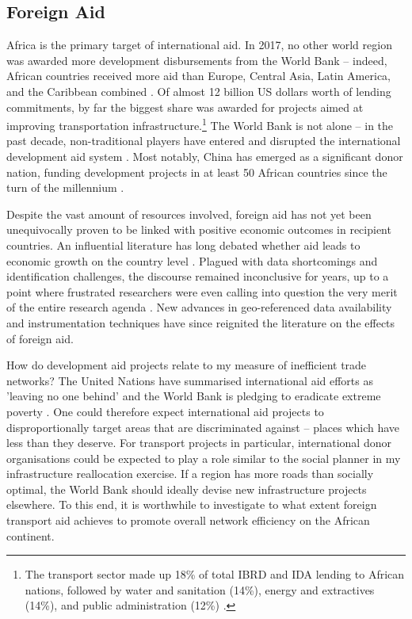 \documentclass[11pt, oneside]{article}   	%
\begin{document}
\subsection{Foreign Aid}
Africa is the primary target of international aid. In 2017, no other world region was awarded more development disbursements from the World Bank -- indeed, African countries received more aid than Europe, Central Asia, Latin America, and the Caribbean combined \citep{TheWorldBank_WorldBankAnnual_2017}. Of almost 12 billion US dollars worth of lending commitments, by far the biggest share was awarded for projects aimed at improving transportation infrastructure.\footnote{The transport sector made up 18\% of total IBRD and IDA lending to African nations, followed by water and sanitation (14\%), energy and extractives (14\%), and public administration (12\%) \citep{TheWorldBank_WorldBankAnnual_2017}.} The World Bank is not alone -- in the past decade, non-traditional players have entered and disrupted the international development aid system \citep{Dreher_Rogueaidempirical_2015}. Most notably, China has emerged as a significant donor nation, funding development projects in at least 50 African countries since the turn of the millennium \citep{Strange_TrackingUnderreportedFinancial_2017}.

Despite the vast amount of resources involved, foreign aid has not yet been unequivocally proven to be linked with positive economic outcomes in recipient countries. An influential literature has long debated whether aid leads to economic growth on the country level \citep{Burnside_AidPoliciesGrowth_2000,Easterly_AidPoliciesGrowth_2004,Rajan_Aidgrowthwhat_2008}. Plagued with data shortcomings and identification challenges, the discourse remained inconclusive for years, up to a point where frustrated researchers were even calling into question the very merit of the entire research agenda \citep{Clemens_CountingChickenswhen_2012,Clemens_NewRoleWorld_2016}. New advances in geo-referenced data availability \citep{Dreher_Aidgrowthregional_2015,Dreher_AidChinaGrowth_2017} and instrumentation techniques \citep{Nunn_USFoodAid_2014,Clemens_CountingChickenswhen_2012} have since reignited the literature on the effects of foreign aid.

How do development aid projects relate to my measure of inefficient trade networks? The United Nations have summarised international aid efforts as 'leaving no one behind' \citep{Briggs_LeavingNoOne_2018} and the World Bank is pledging to eradicate extreme poverty \citep{Clemens_NewRoleWorld_2016}. One could therefore expect international aid projects to disproportionally target areas that are discriminated against -- places which have less than they deserve. For transport projects in particular, international donor organisations could be expected to play a role similar to the social planner in my infrastructure reallocation exercise. If a region has more roads than socially optimal, the World Bank should ideally devise new infrastructure projects elsewhere. To this end, it is worthwhile to investigate to what extent foreign transport aid achieves to promote overall network efficiency on the African continent.
\end{document}
